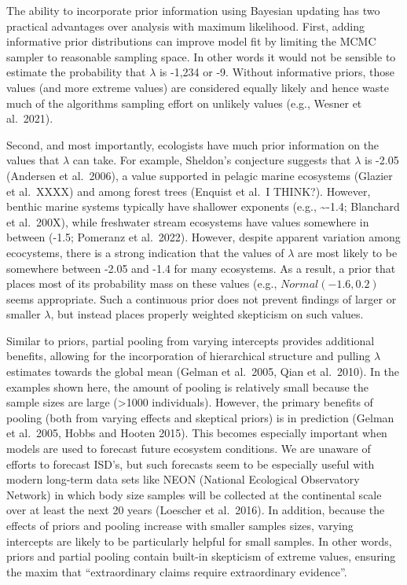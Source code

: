 \documentclass[
  12pt,
]{article}
\begin{document}
The ability to incorporate prior information using Bayesian updating has
two practical advantages over analysis with maximum likelihood. First,
adding informative prior distributions can improve model fit by limiting
the MCMC sampler to reasonable sampling space. In other words it would
not be sensible to estimate the probability that \(\lambda\) is -1,234
or -9. Without informative priors, those values (and more extreme
values) are considered equally likely and hence waste much of the
algorithms sampling effort on unlikely values (e.g., Wesner et
al.~2021).

Second, and most importantly, ecologists have much prior information on
the values that \(\lambda\) can take. For example, Sheldon's conjecture
suggests that \(\lambda\) is -2.05 (Andersen et al.~2006), a value
supported in pelagic marine ecosystems (Glazier et al.~XXXX) and among
forest trees (Enquist et al.~I THINK?). However, benthic marine systems
typically have shallower exponents (e.g., \textasciitilde-1.4; Blanchard
et al.~200X), while freshwater stream ecosystems have values somewhere
in between (-1.5; Pomeranz et al.~2022). However, despite apparent
variation among ecocystems, there is a strong indication that the values
of \(\lambda\) are most likely to be somewhere between -2.05 and -1.4
for many ecosystems. As a result, a prior that places most of its
probability mass on these values (e.g., \(Normal(-1.6, 0.2)\) seems
appropriate. Such a continuous prior does not prevent findings of larger
or smaller \(\lambda\), but instead places properly weighted skepticism
on such values.

Similar to priors, partial pooling from varying intercepts provides
additional benefits, allowing for the incorporation of hierarchical
structure and pulling \(\lambda\) estimates towards the global mean
(Gelman et al.~2005, Qian et al.~2010). In the examples shown here, the
amount of pooling is relatively small because the sample sizes are large
(\textgreater1000 individuals). However, the primary benefits of pooling
(both from varying effects and skeptical priors) is in prediction
(Gelman et al.~2005, Hobbs and Hooten 2015). This becomes especially
important when models are used to forecast future ecosystem conditions.
We are unaware of efforts to forecast ISD's, but such forecasts seem to
be especially useful with modern long-term data sets like NEON (National
Ecological Observatory Network) in which body size samples will be
collected at the continental scale over at least the next 20 years
(Loescher et al.~2016). In addition, because the effects of priors and
pooling increase with smaller samples sizes, varying intercepts are
likely to be particularly helpful for small samples. In other words,
priors and partial pooling contain built-in skepticism of extreme
values, ensuring the maxim that ``extraordinary claims require
extraordinary evidence''.
\end{document}
